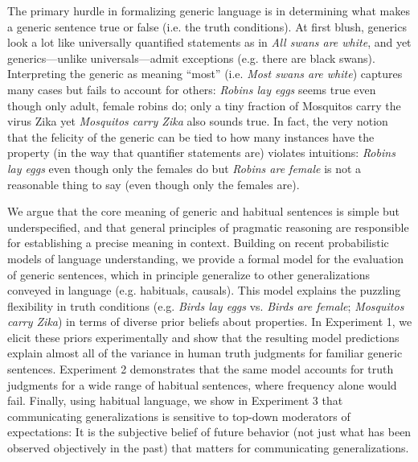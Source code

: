 \documentclass[11pt,letterpaper]{article}
\begin{document}
The primary hurdle in formalizing generic language is in determining what makes a generic sentence true or false (i.e. the truth conditions).
At first blush, generics look a lot like universally quantified statements as in \emph{All swans are white}, and yet generics---unlike universals---admit exceptions (e.g. there are black swans). 
Interpreting the generic as meaning ``most'' (i.e. \emph{Most swans are white}) captures many cases but fails to account for others: \emph{Robins lay eggs} seems true even though only adult, female robins do; only a tiny fraction of Mosquitos carry the virus Zika yet \emph{Mosquitos carry Zika} also sounds true. 
In fact, the very notion that the felicity of the generic can be tied to how many instances have the property (in the way that quantifier statements are) violates intuitions: \emph{Robins lay eggs} even though only the females do but \emph{Robins are female} is not a reasonable thing to say (even though only the females are).


We argue that the core meaning of generic and habitual sentences is simple but underspecified, and that general principles of pragmatic reasoning are responsible for establishing a precise meaning in context. 
Building on recent probabilistic models of language understanding, we provide a formal model for the evaluation of generic sentences, which in principle generalize to other generalizations conveyed in language (e.g. habituals, causals). 
This model explains the puzzling flexibility in truth conditions (e.g. \emph{Birds lay eggs} vs. \emph{Birds are female}; \emph{Mosquitos carry Zika}) in terms of diverse prior beliefs about properties.
In Experiment 1, we elicit these priors experimentally and show that the resulting model predictions explain almost all of the variance in human truth judgments for familiar generic sentences.
Experiment 2 demonstrates that the same model accounts for truth judgments for a wide range of habitual sentences, where frequency alone would fail.
Finally, using habitual language, we show in Experiment 3 that communicating generalizations is sensitive to top-down moderators of expectations: It is the subjective belief of future behavior (not just what has been observed objectively in the past) that matters for communicating generalizations.
\end{document}
